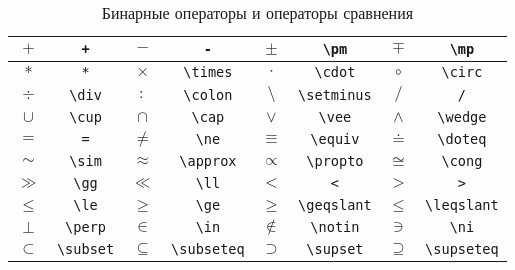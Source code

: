 \begin{table}
	\begin{tabular}{|c|c||c|c||c|c||c|c|}
		\hline $+$ & \Verb|+| 
		& $-$ & \Verb|-| 
		& $\pm$ & \Verb|\pm| 
		& $\mp$ & \Verb|\mp| \\
		\hline $*$ & \Verb|*|
		& $\times$ & \Verb|\times| 
		& $\cdot$ & \Verb|\cdot| 
		& $\circ$ & \Verb|\circ| \\
		\hline $\div$ & \Verb|\div| 
		& $\colon$ & \Verb|\colon| 
		& $\setminus$ & \Verb|\setminus|  
		& $/$ & \Verb|/| \\
		\hline $\cup$ & \Verb|\cup|
		& $\cap$ & \Verb|\cap| 
		& $\vee$ & \Verb|\vee| 
		& $\wedge$ & \Verb|\wedge| \\ 
		\hline $=$ & \Verb|=| 
		& $\ne$ & \Verb|\ne| 
		& $\equiv$ & \Verb|\equiv|
		& $\doteq$ & \Verb|\doteq| \\
		\hline $\sim$ & \Verb|\sim| 
		& $\approx$ & \Verb|\approx| 
		& $\propto$ & \Verb|\propto| 
		& $\cong$ & \Verb|\cong| \\
		\hline $\gg$ & \Verb|\gg| 
		& $\ll$ & \Verb|\ll|
		& $<$ & \Verb|<| 
		& $>$ & \Verb|>| \\ 
		\hline $\le$ & \Verb|\le| 
		& $\ge$ & \Verb|\ge| 
		& $\geqslant$ & \Verb|\geqslant| 
		& $\leqslant$ & \Verb|\leqslant| \\
		\hline $\perp$ & \Verb|\perp|
		& $\in$ & \Verb|\in| 
		& $\notin$ & \Verb|\notin| 
		& $\ni$ & \Verb|\ni| \\  
		\hline $\subset$ & \Verb|\subset|
		& $\subseteq$ & \Verb|\subseteq| 
		& $\supset$ & \Verb|\supset| 
		& $\supseteq$ & \Verb|\supseteq| 
		\\
		\hline
	\end{tabular}
	\caption{Бинарные операторы и операторы сравнения}
\end{table}
